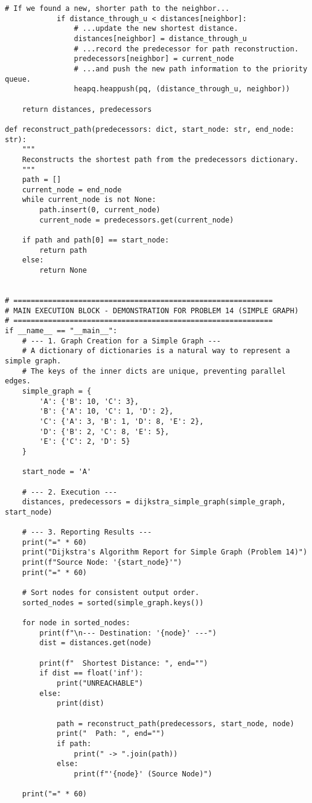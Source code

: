 \documentclass[a4paper,12pt]{article}
\begin{document}
\begin{lstlisting}[style=pythonstyle, caption={Cài đặt Dijkstra bằng Python, có truy vết đường đi.}, label={lst:python}]
            # If we found a new, shorter path to the neighbor...
            if distance_through_u < distances[neighbor]:
                # ...update the new shortest distance.
                distances[neighbor] = distance_through_u
                # ...record the predecessor for path reconstruction.
                predecessors[neighbor] = current_node
                # ...and push the new path information to the priority queue.
                heapq.heappush(pq, (distance_through_u, neighbor))
                
    return distances, predecessors

def reconstruct_path(predecessors: dict, start_node: str, end_node: str):
    """
    Reconstructs the shortest path from the predecessors dictionary.
    """
    path = []
    current_node = end_node
    while current_node is not None:
        path.insert(0, current_node)
        current_node = predecessors.get(current_node)
    
    if path and path[0] == start_node:
        return path
    else:
        return None


# ============================================================
# MAIN EXECUTION BLOCK - DEMONSTRATION FOR PROBLEM 14 (SIMPLE GRAPH)
# ============================================================
if __name__ == "__main__":
    # --- 1. Graph Creation for a Simple Graph ---
    # A dictionary of dictionaries is a natural way to represent a simple graph.
    # The keys of the inner dicts are unique, preventing parallel edges.
    simple_graph = {
        'A': {'B': 10, 'C': 3},
        'B': {'A': 10, 'C': 1, 'D': 2},
        'C': {'A': 3, 'B': 1, 'D': 8, 'E': 2},
        'D': {'B': 2, 'C': 8, 'E': 5},
        'E': {'C': 2, 'D': 5}
    }

    start_node = 'A'

    # --- 2. Execution ---
    distances, predecessors = dijkstra_simple_graph(simple_graph, start_node)

    # --- 3. Reporting Results ---
    print("=" * 60)
    print("Dijkstra's Algorithm Report for Simple Graph (Problem 14)")
    print(f"Source Node: '{start_node}'")
    print("=" * 60)

    # Sort nodes for consistent output order.
    sorted_nodes = sorted(simple_graph.keys())

    for node in sorted_nodes:
        print(f"\n--- Destination: '{node}' ---")
        dist = distances.get(node)
        
        print(f"  Shortest Distance: ", end="")
        if dist == float('inf'):
            print("UNREACHABLE")
        else:
            print(dist)
            
            path = reconstruct_path(predecessors, start_node, node)
            print("  Path: ", end="")
            if path:
                print(" -> ".join(path))
            else:
                print(f"'{node}' (Source Node)")

    print("=" * 60)
\end{lstlisting}
\end{document}
